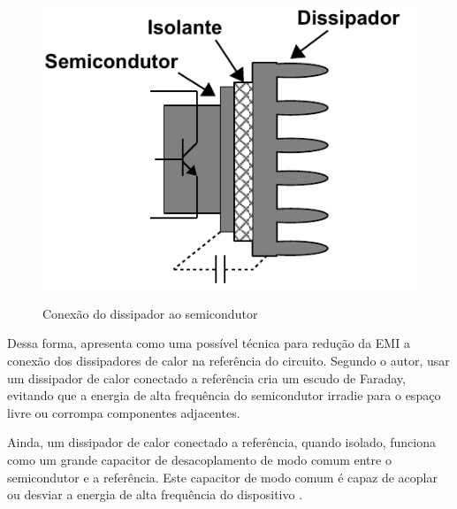             \begin{figure}[H]
            	\centering
            	\caption{Conexão do dissipador ao semicondutor}
            	\includegraphics[scale=.8]{pdf/outros/dissipador.pdf}
            	\label{fig:dissipador_semi}
            \end{figure}
            
            Dessa forma,  apresenta como uma possível técnica para redução da EMI a conexão dos dissipadores de calor na referência do circuito. Segundo o autor, usar um dissipador de calor conectado a referência cria um escudo de Faraday, evitando que a energia de alta frequência do semicondutor irradie para o espaço livre ou corrompa componentes adjacentes. 
            
            Ainda, um dissipador de calor conectado a referência, quando isolado, funciona como um grande capacitor de desacoplamento de modo comum entre o semicondutor e a referência. Este capacitor de modo comum é capaz de acoplar ou desviar a energia de alta frequência do dispositivo \cite{ref:EMC_livro_PrintedCircuit}.
            
            
            
            
